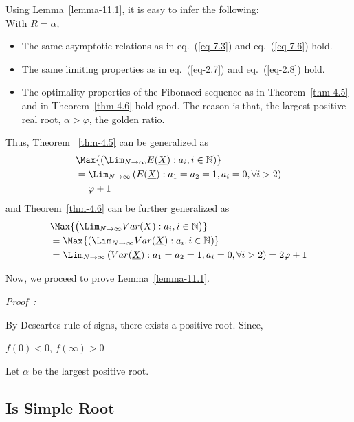 \begin{multicols}{2}
Using Lemma~\ref{lemma-11.1}, it is easy to infer the following:\\
With $R = \alpha$,
\begin{itemize}
\item The same asymptotic relations as in eq.~(\ref{eq-7.3}) and eq.~(\ref{eq-7.6}) hold. 
\item The same limiting properties as in eq.~(\ref{eq-2.7}) and eq.~(\ref{eq-2.8}) hold.
\item The optimality properties of the Fibonacci sequence as in Theorem~\ref{thm-4.5} and in Theorem~\ref{thm-4.6} hold good. The reason is that, the largest positive real root, $\alpha > \varphi$, the golden ratio.
\end{itemize}
Thus, Theorem ~\ref{thm-4.5} can be generalized as 
\begin{align*}
&\Max{\left(\Lim_{N\rightarrow \infty} E(\underline{X}): a_i, i \in \mathbb N \right)}\\
 &= \Lim_{N \rightarrow \infty}\left(E(\underline{X}):a_1 = a_2 = 1, a_{i}=0, \forall i> 2\right)\\
   &= \varphi + 1
\end{align*}
and Theorem~\ref{thm-4.6} can be further generalized as 
\begin{align*}
&\Max{\left(\Lim_{N\rightarrow \infty}Var(\bar{X}): a_i, i \in \mathbb N\right)}\\
&= \Max{\left(\Lim_{N\rightarrow \infty}Var(\underline{X}): a_i, i \in \mathbb N\right)}\\
\nonumber &= \Lim_{N \rightarrow \infty}\left(Var(\underline{X}):a_1=a_2=1, a_{i}=0,\forall i > 2\right) = 2\varphi + 1
\end{align*}

Now, we proceed to prove Lemma~\ref{lemma-11.1}.

{\it Proof~:}

By Descartes rule of signs, there exists a positive root. Since, 

\vspace{-.7cm}
 \begin{center}
 $ f(0) < 0$, $f(\infty) > 0$ \\
 \end{center}

\vspace{-.3cm}

Let $\alpha$ be the largest positive root. 

\vspace{-.3cm}

\subsection{\hspace{-.3cm}{\greekfont α} Is Simple Root}\label{subsection-11.1}


\end{multicols}
